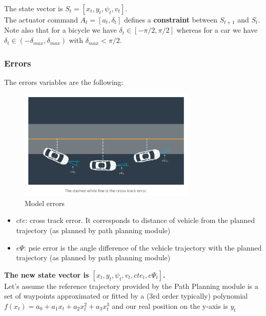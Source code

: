 \documentclass[11pt]{article}
\begin{document}
The state vector is $ S_t = [x_t, y_t, \psi_t, v_t] $. \\
The actuator command $ A_t = [ a_t, \delta_t ] $ defines a \textbf{constraint} between $S_{t+1}$ and $ S_t $. \\

Note also that for a bicycle we have $\delta_t  \in [-\pi / 2, \pi / 2]$ whereas for a car we have $\delta_t  \in (-\delta_{max}, \delta_{max})$ with $\delta_{max} < \pi / 2$.


\subsubsection{Errors}

The errors variables are the following:
\begin{figure}[h]
    \centering
    \includegraphics[width=0.75\textwidth]{errors}
    \caption{Model errors}
    \label{fig:errors}
\end{figure}
\FloatBarrier

\begin{itemize}
\item $cte$: cross track error. It corresponds to distance of vehicle from the planned trajectory (as planned by path planning module)
\item $e\Psi$: psie error is the angle difference of the vehicle trajectory with the planned trajectory (as planned by path planning module)
\end{itemize}

\textbf{The new state vector is $[x_t, y_t, \psi_t, v_t, cte_t, e\Psi_t]$.
} \\


Let's assume the reference trajectory provided by the Path Planning module is a set of waypoints approximated or fitted by a (3rd order typically) polynomial $f(x_t)= a_0 + a_1 x_t + a_2 x_t^2 + a_3 x_t^3$ and our real position on the y-axis is $y_t$ \\
\end{document}

